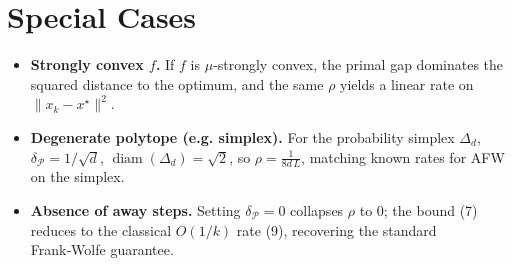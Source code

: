 \documentclass{article}
\newcommand{\diam}{\operatorname{diam}}
\newcommand{\pyr}{\delta_{\mathcal{P}}}
\begin{document}
\section*{Special Cases}
\begin{itemize}[leftmargin=*]
\item \textbf{Strongly convex $f$.} If $f$ is $\mu$‑strongly convex, the primal gap dominates the squared distance to the optimum, and the same $\rho$ yields a linear rate on $\|x_k-x^\star\|^{2}$.
\item \textbf{Degenerate polytope (e.g. simplex).} For the probability simplex $\Delta_{d}$, $\pyr=1/\sqrt{d}$, $\diam(\Delta_{d})=\sqrt{2}$, so $\rho = \frac{1}{8d\,L}$, matching known rates for AFW on the simplex.
\item \textbf{Absence of away steps.} Setting $\pyr=0$ collapses $\rho$ to $0$; the bound (7) reduces to the classical $O(1/k)$ rate (9), recovering the standard Frank‑Wolfe guarantee.
\end{itemize}
\end{document}
